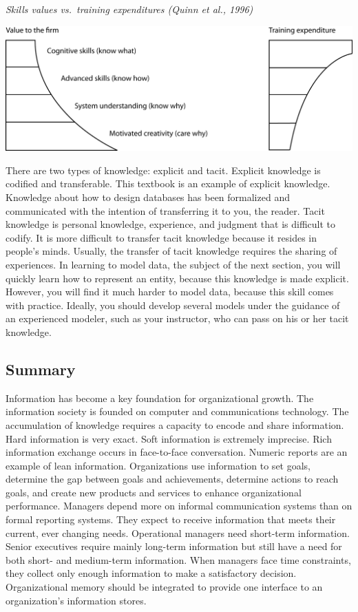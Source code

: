 \documentclass[
]{article}
\begin{document}
\emph{Skills values vs.~training expenditures (Quinn et al., 1996)}

\includegraphics{Figures/Chapter 2/knowledge and training.png}

There are two types of knowledge: explicit and tacit. Explicit knowledge
is codified and transferable. This textbook is an example of explicit
knowledge. Knowledge about how to design databases has been formalized
and communicated with the intention of transferring it to you, the
reader. Tacit knowledge is personal knowledge, experience, and judgment
that is difficult to codify. It is more difficult to transfer tacit
knowledge because it resides in people's minds. Usually, the transfer of
tacit knowledge requires the sharing of experiences. In learning to
model data, the subject of the next section, you will quickly learn how
to represent an entity, because this knowledge is made explicit.
However, you will find it much harder to model data, because this skill
comes with practice. Ideally, you should develop several models under
the guidance of an experienced modeler, such as your instructor, who can
pass on his or her tacit knowledge.

\hypertarget{summary-1}{%
\subsection*{Summary}\label{summary-1}}

Information has become a key foundation for organizational growth. The
information society is founded on computer and communications
technology. The accumulation of knowledge requires a capacity to encode
and share information. Hard information is very exact. Soft information
is extremely imprecise. Rich information exchange occurs in face-to-face
conversation. Numeric reports are an example of lean information.
Organizations use information to set goals, determine the gap between
goals and achievements, determine actions to reach goals, and create new
products and services to enhance organizational performance. Managers
depend more on informal communication systems than on formal reporting
systems. They expect to receive information that meets their current,
ever changing needs. Operational managers need short-term information.
Senior executives require mainly long-term information but still have a
need for both short- and medium-term information. When managers face
time constraints, they collect only enough information to make a
satisfactory decision. Organizational memory should be integrated to
provide one interface to an organization's information stores.
\end{document}
